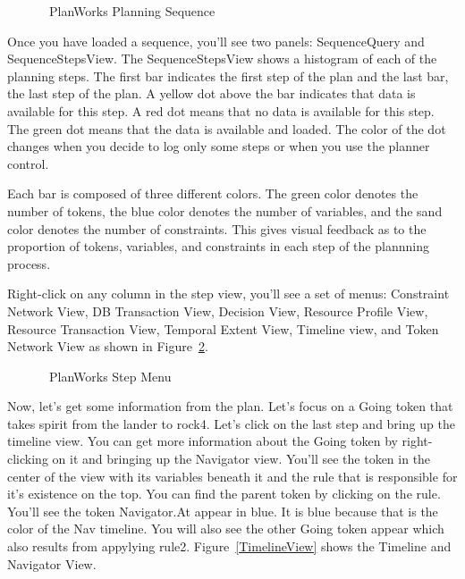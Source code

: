 \documentclass[10pt, letterpaper, twoside]{article}
\begin{document}
\begin{figure}[h]
\centering{}
\caption{\ET\, PlanWorks Planning Sequence}
\label{PlanningSequence}
\end{figure}

Once you have loaded a sequence, you'll see two panels: SequenceQuery and
SequenceStepsView. The SequenceStepsView shows a histogram of each of the
planning steps.  The first bar indicates the first step of the plan and
the last bar, the last step of the plan.  A yellow dot above the bar
indicates that data is available for this step.  A red dot means that no
data is available for this step.  The green dot means that the data is
available and loaded.  The color of the dot changes when you decide to log
only some steps or when you use the planner control.  

Each bar is composed of three different colors.  The green color denotes
the number of tokens, the blue color denotes the number of variables, and
the sand color denotes the number of constraints.  This gives visual
feedback as to the proportion of tokens, variables, and constraints in each
step of the plannning process.

Right-click on any column in the step view, you'll see a set of menus:
Constraint Network View, DB Transaction View, Decision View, Resource
Profile View, Resource Transaction View, Temporal Extent View, Timeline
view, and Token Network View as shown in Figure~\ref{StepMenu}.

\begin{figure}[h]
\centering{}
\caption{\ET\, PlanWorks Step Menu}
\label{StepMenu}
\end{figure}

Now, let's get some information from the plan.  Let's focus on a Going
token that takes spirit from the lander to rock4.  Let's click on the last
step and bring up the timeline view. You can get more information about the
Going token by right-clicking on it and bringing up the Navigator view.
You'll see the token in the center of the view with its variables beneath
it and the rule that is responsible for it's existence on the top.  You can
find the parent token by clicking on the rule.  You'll see the token
Navigator.At appear in blue.  It is blue because that is the color of the
Nav timeline.  You will also see the other Going token appear which also
results from appylying rule2.  Figure~\ref{TimelineView} shows the Timeline
and Navigator View.
\end{document}

